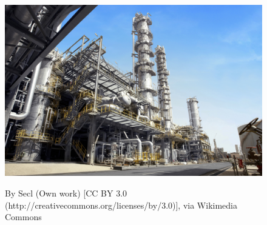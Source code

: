 
\blankscreen{
}

\begin{frame}{}
    \begin{figure}
        \includegraphics[scale=0.6]{images/plant}

        \footnotesize{By Secl (Own work) [CC BY 3.0 (http://creativecommons.org/licenses/by/3.0)], via Wikimedia Commons}
    \end{figure}
\end{frame}
